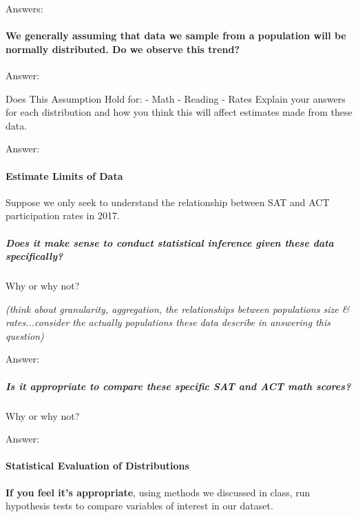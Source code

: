 \documentclass[11pt]{article}
\begin{document}
    Answers:

    \paragraph{We generally assuming that data we sample from a population
will be normally distributed. Do we observe this
trend?}\label{we-generally-assuming-that-data-we-sample-from-a-population-will-be-normally-distributed.-do-we-observe-this-trend}

    Answer:

    Does This Assumption Hold for: - Math - Reading - Rates Explain your
answers for each distribution and how you think this will affect
estimates made from these data.

    Answer:

    \paragraph{Estimate Limits of Data}\label{estimate-limits-of-data}

Suppose we only seek to understand the relationship between SAT and ACT
participation rates in 2017.

\subparagraph{Does it make sense to conduct statistical inference given
these data
specifically?}\label{does-it-make-sense-to-conduct-statistical-inference-given-these-data-specifically}

Why or why not?

\emph{(think about granularity, aggregation, the relationships between
populations size \& rates...consider the actually populations these data
describe in answering this question)}

    Answer:

    \subparagraph{\texorpdfstring{Is it appropriate to compare \emph{these}
specific SAT and ACT math
scores?}{Is it appropriate to compare these specific SAT and ACT math scores?}}\label{is-it-appropriate-to-compare-these-specific-sat-and-act-math-scores}

Why or why not?

    Answer:

    \paragraph{Statistical Evaluation of
Distributions}\label{statistical-evaluation-of-distributions}

\textbf{If you feel it's appropriate}, using methods we discussed in
class, run hypothesis tests to compare variables of interest in our
dataset.
\end{document}
